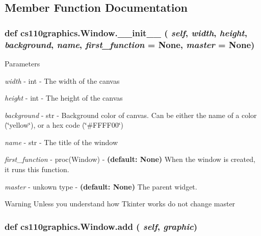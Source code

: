 \subsection{Member Function Documentation}
\hypertarget{classcs110graphics_1_1Window_af926549e3d731847886302fa390f2863}{
\subsubsection[{\_\-\_\-init\_\-\_\-}]{\setlength{\rightskip}{0pt plus 5cm}def cs110graphics.Window.\_\-\_\-init\_\-\_\- ( {\em self}, \/   {\em width}, \/   {\em height}, \/   {\em background}, \/   {\em name}, \/   {\em first\_\-function} = {\ttfamily None}, \/   {\em master} = {\ttfamily None})}}
\label{classcs110graphics_1_1Window_af926549e3d731847886302fa390f2863}

\begin{DoxyParams}{Parameters}
\item[{\em width}]-\/ int -\/ The width of the canvas \item[{\em height}]-\/ int -\/ The height of the canvas \item[{\em background}]-\/ str -\/ Background color of canvas. Can be either the name of a color (\char`\"{}yellow\char`\"{}), or a hex code (\char`\"{}\#FFFF00\char`\"{}) \item[{\em name}]-\/ str -\/ The title of the window \item[{\em first\_\-function}]-\/ proc(Window) -\/ {\bfseries (default: None)} When the window is created, it runs this function. \item[{\em master}]-\/ unkown type -\/ {\bfseries (default: None)} The parent widget. \end{DoxyParams}
\begin{DoxyWarning}{Warning}
Unless you understand how Tkinter works do not change master 
\end{DoxyWarning}
\hypertarget{classcs110graphics_1_1Window_a34064de02d5149841a23764e78085d18}{
\subsubsection[{add}]{\setlength{\rightskip}{0pt plus 5cm}def cs110graphics.Window.add ( {\em self}, \/   {\em graphic})}}
\label{classcs110graphics_1_1Window_a34064de02d5149841a23764e78085d18}


